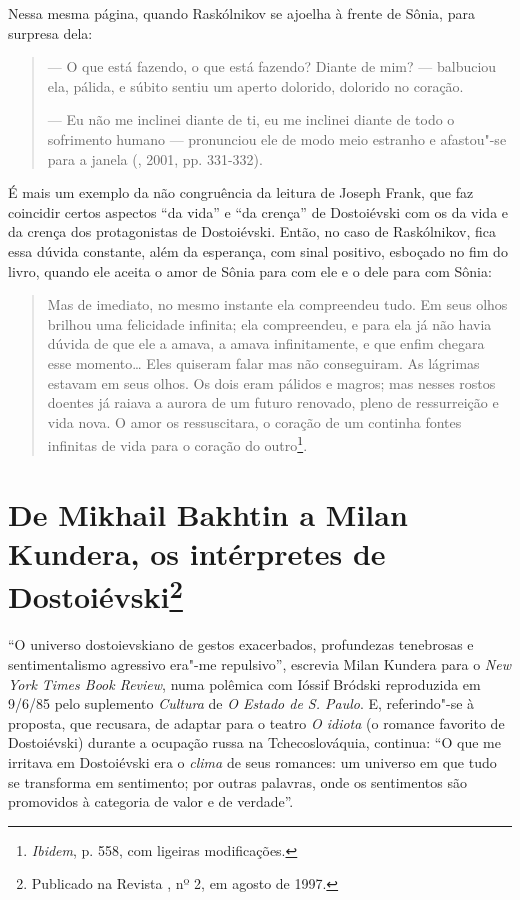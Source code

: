 Nessa mesma página, quando Raskólnikov se ajoelha à frente de Sônia,
para surpresa dela:

\begin{quote}
--- O que está fazendo, o que está fazendo? Diante de mim? --- balbuciou
ela, pálida, e súbito sentiu um aperto dolorido, dolorido no coração.

--- Eu não me inclinei diante de ti, eu me inclinei diante de todo o
sofrimento humano --- pronunciou ele de modo meio estranho e afastou"-se
para a janela (, 2001, pp. 331-332).
\end{quote}

É mais um exemplo da não congruência da leitura de Joseph Frank, que faz
coincidir certos aspectos ``da vida'' e ``da crença'' de Dostoiévski com
os da vida e da crença dos protagonistas de Dostoiévski. Então, no caso
de Raskólnikov, fica essa dúvida constante, além da esperança, com sinal
positivo, esboçado no fim do livro, quando ele aceita o amor de Sônia
para com ele e o dele para com Sônia:

\begin{quote}
Mas de imediato, no mesmo instante ela compreendeu tudo. Em seus olhos
brilhou uma felicidade infinita; ela compreendeu, e para ela já não
havia dúvida de que ele a amava, a amava infinitamente, e que enfim
chegara esse momento\ldots{} Eles quiseram falar mas não conseguiram. As
lágrimas estavam em seus olhos. Os dois eram pálidos e magros; mas
nesses rostos doentes já raiava a aurora de um futuro renovado, pleno de
ressurreição e vida nova. O amor os ressuscitara, o coração de um
continha fontes infinitas de vida para o coração do outro\footnote{\emph{Ibidem},
  p. 558, com ligeiras modificações.}.
\end{quote}

\chapter{De Mikhail Bakhtin a Milan Kundera, os intérpretes de
Dostoiévski\footnote{Publicado na Revista , nº 2, em agosto de 1997.}}

``O universo dostoievskiano de gestos exacerbados, profundezas
tenebrosas e sentimen­talismo agressivo era"-me repulsivo'', escrevia
Milan Kundera para o \emph{New York Times Book Review}, numa polêmica
com Ióssif Bródski reproduzida em 9/6/85 pelo suplemento \emph{Cultura}
de \emph{O Estado de S. Paulo}. E, referindo"-se à proposta, que
recusara, de adaptar para o teatro \emph{O idiota} (o romance favorito
de Dostoiévski) durante a ocupação russa na Tchecoslováquia, continua:
``O que me irritava em Dostoiévski era o \emph{clima} de seus romances:
um universo em que tudo se transforma em sentimento; por outras
palavras, onde os sentimentos são promovidos à categoria de valor e de
verdade''.


